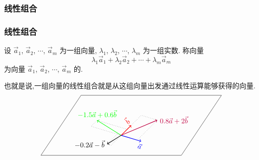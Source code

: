 \subsubsection{线性组合}
\begin{frame}\frametitle{线性组合}
\begin{definition}[线性组合]
设 $\vec{a}_1$, $\vec{a}_2$, $\cdots$, $\vec{a}_m$  为一组向量, $\lambda_1$, $\lambda_2$, $\cdots$, $\lambda_m$ 为一组实数. 称向量
\[\lambda_1\vec{a}_1 + \lambda_2\vec{a}_2 + \cdots + \lambda_m\vec{a}_m\]
为向量 $\vec{a}_1$, $\vec{a}_2$, $\cdots$, $\vec{a}_m$ 的.
\end{definition}
\pp
也就是说,一组向量的线性组合就是从这组向量出发通过线性运算能够获得的向量.
\pp
\begin{equation*}
\begin{tikzpicture}[scale=1]
\coordinate (O) at (0,0);
\coordinate (A) at (1,-0.3);
\coordinate (B) at (0.5,0.5);
\coordinate (08A) at (0.8,-0.24);
\coordinate (2B) at (1,1);
\coordinate (C1) at (1.8,0.76);   %
\coordinate (m15A) at (-1.5,0.45);
\coordinate (06B) at (0.3,0.3);
\coordinate (C2) at (-1.2,0.75);   %
\coordinate (m02A) at (-0.2,0.06);
\coordinate (mB) at (-0.5,-0.5);
\coordinate (C3) at (-0.7,-0.44);   %
\coordinate (D) at (-0.5,2.5);
\pp
\draw (-4,-1)--(-2,2)--(5,2)--(3,-1)--(-4,-1);
\draw[->,thick,blue](O)--(A) node[pos=1,sloped,below] {$\vec{a}$};
\draw[->,thick,red](O)--(B) node[pos=1,sloped,above] {$\vec{b}$};
\pp
\draw[->,thick,purple](O)--(C1) node[pos=1,right] {$0.8\vec{a}+2\vec{b}$};
\draw[dotted](B)--(2B)--(C1)--(08A);
\pp
\draw[->,thick,green](O)--(C2) node[pos=1,above] {$-1.5\vec{a}+0.6\vec{b}$};
\draw[dotted](06B)--(C2)--(m15A)--(O);
\pp
\draw[->,thick,black](O)--(C3) node[pos=1,left] {$-0.2\vec{a}-\vec{b}$};
\draw[dotted](m02A)--(C3)--(mB)--(O);
\end{tikzpicture}
\end{equation*}


\end{frame}


